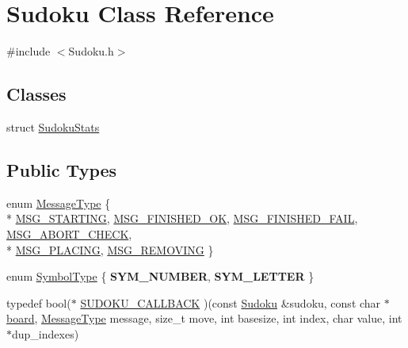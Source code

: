 \hypertarget{classSudoku}{\section{Sudoku Class Reference}
\label{classSudoku}
}


{\ttfamily \#include $<$Sudoku.\-h$>$}

\subsection*{Classes}
\begin{DoxyCompactItemize}
\item 
struct \hyperlink{structSudoku_1_1SudokuStats}{Sudoku\-Stats}
\end{DoxyCompactItemize}
\subsection*{Public Types}
\begin{DoxyCompactItemize}
\item 
enum \hyperlink{classSudoku_aefec02cf42686a826d35086979afba62}{Message\-Type} \{ \\*
\hyperlink{classSudoku_aefec02cf42686a826d35086979afba62a317c7191f8f325bf5d2374d421d237bd}{M\-S\-G\-\_\-\-S\-T\-A\-R\-T\-I\-N\-G}, 
\hyperlink{classSudoku_aefec02cf42686a826d35086979afba62a238f9c3e901ca474f3240d4d494cdea9}{M\-S\-G\-\_\-\-F\-I\-N\-I\-S\-H\-E\-D\-\_\-\-O\-K}, 
\hyperlink{classSudoku_aefec02cf42686a826d35086979afba62a0d80c90a2855bfe71eada099907aa9c0}{M\-S\-G\-\_\-\-F\-I\-N\-I\-S\-H\-E\-D\-\_\-\-F\-A\-I\-L}, 
\hyperlink{classSudoku_aefec02cf42686a826d35086979afba62a81b3af563a631c4d44661eb5f3deee68}{M\-S\-G\-\_\-\-A\-B\-O\-R\-T\-\_\-\-C\-H\-E\-C\-K}, 
\\*
\hyperlink{classSudoku_aefec02cf42686a826d35086979afba62adfc3bf46903901085cb0faaa25455b13}{M\-S\-G\-\_\-\-P\-L\-A\-C\-I\-N\-G}, 
\hyperlink{classSudoku_aefec02cf42686a826d35086979afba62ab14ccf4c6ab43633bb9a5a4dc7e13bd6}{M\-S\-G\-\_\-\-R\-E\-M\-O\-V\-I\-N\-G}
 \}
\item 
enum \hyperlink{classSudoku_ae58a74aa553563f6db22b82329631838}{Symbol\-Type} \{ {\bfseries S\-Y\-M\-\_\-\-N\-U\-M\-B\-E\-R}, 
{\bfseries S\-Y\-M\-\_\-\-L\-E\-T\-T\-E\-R}
 \}
\item 
typedef bool($\ast$ \hyperlink{classSudoku_ab9d5a4c123c93f3afb066e5f83149c57}{S\-U\-D\-O\-K\-U\-\_\-\-C\-A\-L\-L\-B\-A\-C\-K} )(const \hyperlink{classSudoku}{Sudoku} \&sudoku, const char $\ast$\hyperlink{classSudoku_a2c25d58e03cdc46ec8774a449fd32d81}{board}, \hyperlink{classSudoku_aefec02cf42686a826d35086979afba62}{Message\-Type} message, size\-\_\-t move, int basesize, int index, char value, int $\ast$dup\-\_\-indexes)
\end{DoxyCompactItemize}
